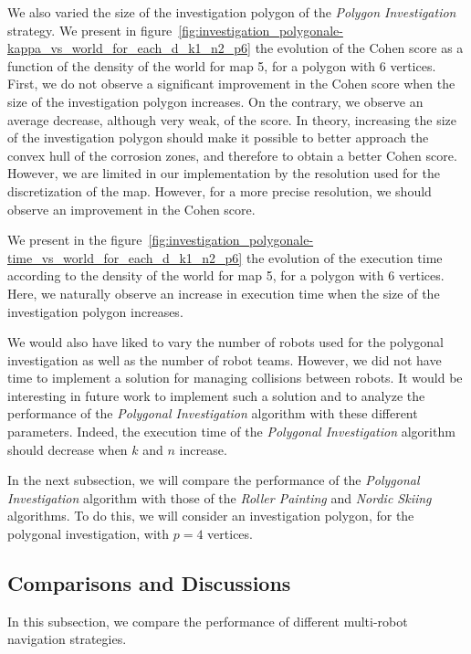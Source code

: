 \documentclass[english,RandD]{rapportPFE}  %
\begin{document}
			We also varied the size of the investigation polygon of the \textit{Polygon Investigation} strategy.
			We present in figure~\ref{fig:investigation_polygonale-kappa_vs_world_for_each_d_k1_n2_p6} the evolution of the Cohen score as a function of the density of the world for map 5, for a polygon with 6 vertices.
			First, we do not observe a significant improvement in the Cohen score when the size of the investigation polygon increases.
			On the contrary, we observe an average decrease, although very weak, of the score.
			In theory, increasing the size of the investigation polygon should make it possible to better approach the convex hull of the corrosion zones, and therefore to obtain a better Cohen score.
			However, we are limited in our implementation by the resolution used for the discretization of the map.
			However, for a more precise resolution, we should observe an improvement in the Cohen score.

			We present in the figure~\ref{fig:investigation_polygonale-time_vs_world_for_each_d_k1_n2_p6} the evolution of the execution time according to the density of the world for map 5, for a polygon with 6 vertices.
			Here, we naturally observe an increase in execution time when the size of the investigation polygon increases.

			We would also have liked to vary the number of robots used for the polygonal investigation as well as the number of robot teams.
			However, we did not have time to implement a solution for managing collisions between robots.
			It would be interesting in future work to implement such a solution and to analyze the performance of the \textit{Polygonal Investigation} algorithm with these different parameters.
			Indeed, the execution time of the \textit{Polygonal Investigation} algorithm should decrease when $k$ and $n$ increase.

			In the next subsection, we will compare the performance of the \textit{Polygonal Investigation} algorithm with those of the \textit{Roller Painting} and \textit{Nordic Skiing} algorithms.
			To do this, we will consider an investigation polygon, for the polygonal investigation, with $p = 4$ vertices.
		\subsection*{Comparisons and Discussions}
			In this subsection, we compare the performance of different multi-robot navigation strategies.
\end{document}
